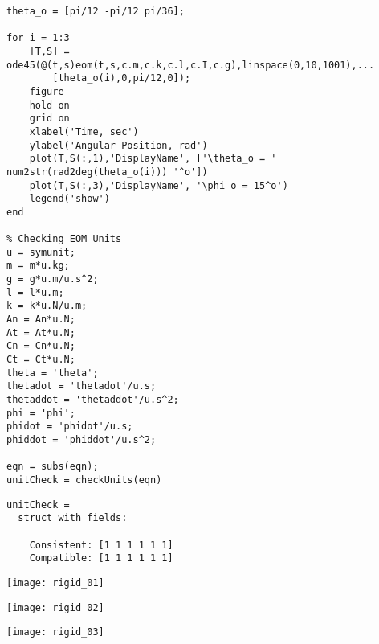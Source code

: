 \begin{lstlisting}[frame=lines,style=Matlab-editor]
theta_o = [pi/12 -pi/12 pi/36];

for i = 1:3
    [T,S] = ode45(@(t,s)eom(t,s,c.m,c.k,c.l,c.I,c.g),linspace(0,10,1001),...
        [theta_o(i),0,pi/12,0]);
    figure
    hold on
    grid on
    xlabel('Time, sec')
    ylabel('Angular Position, rad')
    plot(T,S(:,1),'DisplayName', ['\theta_o = ' num2str(rad2deg(theta_o(i))) '^o'])
    plot(T,S(:,3),'DisplayName', '\phi_o = 15^o')
    legend('show')
end

% Checking EOM Units
u = symunit;
m = m*u.kg;
g = g*u.m/u.s^2;
l = l*u.m;
k = k*u.N/u.m;
An = An*u.N;
At = At*u.N;
Cn = Cn*u.N;
Ct = Ct*u.N;
theta = 'theta';
thetadot = 'thetadot'/u.s;
thetaddot = 'thetaddot'/u.s^2;
phi = 'phi';
phidot = 'phidot'/u.s;
phiddot = 'phiddot'/u.s^2;

eqn = subs(eqn);
unitCheck = checkUnits(eqn)
\end{lstlisting}
\color{gray} \begin{verbatim}
unitCheck =
  struct with fields:

    Consistent: [1 1 1 1 1 1]
    Compatible: [1 1 1 1 1 1]
\end{verbatim} \color{black}
\center
\texttt{[image: rigid\_01]}

\texttt{[image: rigid\_02]}

\texttt{[image: rigid\_03]}
